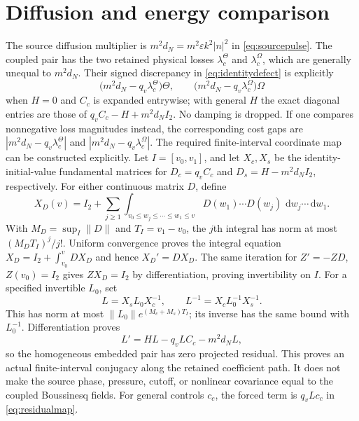 \documentclass[11pt]{article}
\newcommand{\dd}{\,\mathrm d}
\begin{document}
\section{Diffusion and energy comparison}
The source diffusion multiplier is $m^2d_N=m^2\varepsilon k^2|n|^2$ in
\eqref{eq:sourcepulse}.  The coupled pair has the two retained physical losses
$\lambda_c^\Theta$ and $\lambda_c^\Omega$, which are generally unequal to
$m^2d_N$.  Their signed discrepancy in \eqref{eq:identitydefect} is explicitly
\begin{equation}
 \bigl(m^2d_N-q_v\lambda_c^\Theta\bigr)\Theta,
 \qquad
 \bigl(m^2d_N-q_v\lambda_c^\Omega\bigr)\Omega
\end{equation}
when $H=0$ and $C_c$ is expanded entrywise; with general $H$ the exact
diagonal entries are those of $q_vC_c-H+m^2d_NI_2$.  No damping is dropped.
If one compares nonnegative loss magnitudes instead, the corresponding cost
gaps are $|m^2d_N-q_v\lambda_c^\Theta|$ and
$|m^2d_N-q_v\lambda_c^\Omega|$.
The required finite-interval coordinate map can be constructed explicitly.
Let $I=[v_0,v_1]$, and let $X_c,X_s$ be the identity-initial-value
fundamental matrices for $D_c=q_vC_c$ and $D_s=H-m^2d_NI_2$,
respectively. For either continuous matrix $D$, define
\[
 X_D(v)=I_2+\sum_{j\ge1}
 \int_{v_0\le w_j\le\cdots\le w_1\le v}
 D(w_1)\cdots D(w_j)\,\dd w_j\cdots\dd w_1 .
\]
With $M_D=\sup_I\|D\|$ and $T_I=v_1-v_0$, the $j$th integral has norm
at most $(M_DT_I)^j/j!$. Uniform convergence proves the integral equation
$X_D=I_2+\int_{v_0}^vDX_D$ and hence $X_D'=DX_D$.
The same iteration for $Z'=-ZD$, $Z(v_0)=I_2$ gives $ZX_D=I_2$
by differentiation, proving invertibility on $I$. For a specified
invertible $L_0$, set
\[
 L=X_sL_0X_c^{-1},\qquad L^{-1}=X_cL_0^{-1}X_s^{-1}.
\]
This has norm at most $\|L_0\|e^{(M_c+M_s)T_I}$; its inverse has the
same bound with $L_0^{-1}$. Differentiation proves
\begin{equation}
 L'=HL-q_vLC_c-m^2d_NL,
 \label{eq:intertwiner}
\end{equation}
so the homogeneous embedded pair has zero projected residual. This proves
an actual finite-interval conjugacy along the retained coefficient path.
It does not make the source phase,
pressure, cutoff, or nonlinear covariance equal to the coupled Boussinesq fields.
For general controls $c_c$, the forced term is $q_vLc_c$ in
\eqref{eq:residualmap}.
\end{document}
